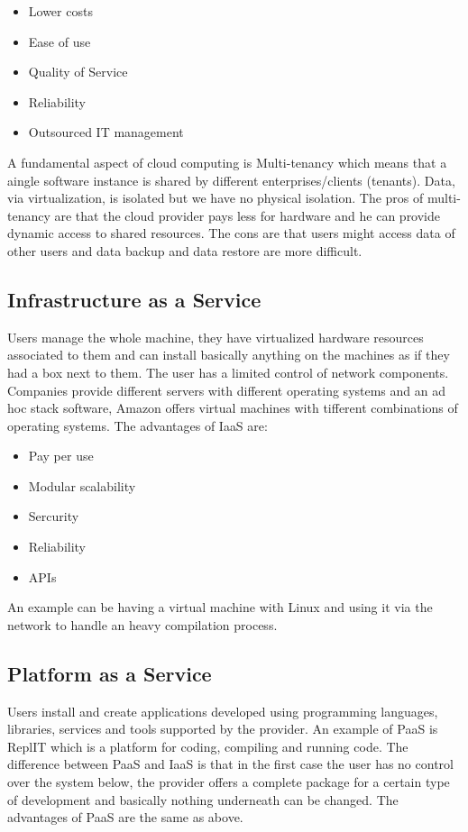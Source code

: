 \begin{itemize}
    \item Lower costs
    \item Ease of use
    \item Quality of Service
    \item Reliability
    \item Outsourced IT management
\end{itemize}
A fundamental aspect of cloud computing is Multi-tenancy which means that a aingle software instance is shared by different enterprises/clients (tenants). Data, via virtualization, is isolated but we have no physical isolation. \n
The pros of multi-tenancy are that the cloud provider pays less for hardware and he can provide dynamic access to shared resources. \n
The cons are that users might access data of other users and data backup and data restore are more difficult.
\subsection{Infrastructure as a Service}
Users manage the whole machine, they have virtualized hardware resources associated to them and can install basically anything on the machines as if they had a box next to them. The user has a limited control of network components. \n
Companies provide different servers with different operating systems and an ad hoc stack software, Amazon offers virtual machines with tifferent combinations of operating systems. \n
The advantages of IaaS are:
\begin{itemize}
    \item Pay per use
    \item Modular scalability
    \item Sercurity
    \item Reliability
    \item APIs
\end{itemize}
An example can be having a virtual machine with Linux and using it via the network to handle an heavy compilation process.
\subsection{Platform as a Service}
Users install and create applications developed using programming languages, libraries, services and tools supported by the provider. \n
An example of PaaS is ReplIT which is a platform for coding, compiling and running code. The difference between PaaS and IaaS is that in the first case the user has no control over the system below, the provider offers a complete package for a certain type of development and basically nothing underneath can be changed. \n
The advantages of PaaS are the same as above.
